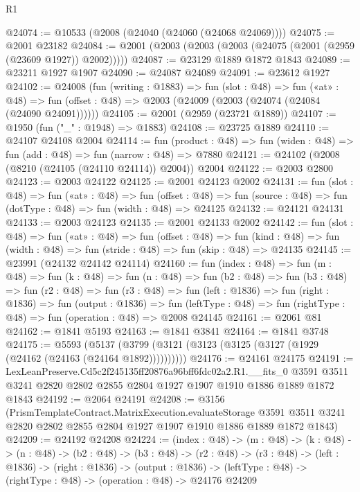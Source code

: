 \begin{lexlean}{R1}
\begin{coremodule}
@24074 := @10533 (@2008 (@24040 (@24060 (@24068 @24069))))
@24075 := @2001 @23182
@24084 := @2001 (@2003 (@2003 (@2003 (@24075 (@2001 (@2959 (@23609 @1927)) @2002)))))
@24087 := @23129 @1889 @1872 @1843
@24089 := @23211 @1927 @1907
@24090 := @24087 @24089
@24091 := @23612 @1927
@24102 := @24008
    (fun (writing : @1883) =>
    fun (slot : @48) =>
    fun («at» : @48) =>
    fun (offset : @48) => @2003 (@24009 (@2003 (@24074 (@24084 (@24090 @24091))))))
@24105 := @2001 (@2959 (@23721 @1889))
@24107 := @1950 (fun ("_" : @1948) => @1883)
@24108 := @23725 @1889
@24110 := @24107 @24108 @2004
@24114 := fun (product : @48) => fun (widen : @48) => fun (add : @48) => fun (narrow : @48) => @7880
@24121 := @24102 (@2008 (@8210 (@24105 (@24110 @24114)) @2004)) @2004
@24122 := @2003 @2800
@24123 := @2003 @24122
@24125 := @2001 @24123 @2002
@24131 := fun (slot : @48) =>
  fun («at» : @48) =>
  fun (offset : @48) => fun (source : @48) => fun (dotType : @48) => fun (width : @48) => @24125
@24132 := @24121 @24131
@24133 := @2003 @24123
@24135 := @2001 @24133 @2002
@24142 := fun (slot : @48) =>
  fun («at» : @48) =>
  fun (offset : @48) =>
  fun (kind : @48) => fun (width : @48) => fun (stride : @48) => fun (skip : @48) => @24135
@24145 := @23991 (@24132 @24142 @24114)
@24160 := fun (index : @48) =>
  fun (m : @48) =>
  fun (k : @48) =>
  fun (n : @48) =>
  fun (b2 : @48) =>
  fun (b3 : @48) =>
  fun (r2 : @48) =>
  fun (r3 : @48) =>
  fun (left : @1836) =>
  fun (right : @1836) =>
  fun (output : @1836) =>
  fun (leftType : @48) => fun (rightType : @48) => fun (operation : @48) => @2008 @24145
@24161 := @2061 @81
@24162 := @1841 @5193
@24163 := @1841 @3841
@24164 := @1841 @3748
@24175 := @5593
    (@5137 (@3799 (@3121 (@3123 (@3125 (@3127 (@1929 (@24162 (@24163 (@24164 @1892))))))))))
@24176 := @24161 @24175
@24191 := LexLeanPreserve.Cd5c2f245135ff20876a96bff6fdc02a2.R1.__fits_0
    @3591
    @3511
    @3241
    @2820
    @2802
    @2855
    @2804
    @1927
    @1907
    @1910
    @1886
    @1889
    @1872
    @1843
@24192 := @2064 @24191
@24208 := @3156
    (PrismTemplateContract.MatrixExecution.evaluateStorage
      @3591
      @3511
      @3241
      @2820
      @2802
      @2855
      @2804
      @1927
      @1907
      @1910
      @1886
      @1889
      @1872
      @1843)
@24209 := @24192 @24208
@24224 := (index : @48) ->
  (m : @48) ->
  (k : @48) ->
  (n : @48) ->
  (b2 : @48) ->
  (b3 : @48) ->
  (r2 : @48) ->
  (r3 : @48) ->
  (left : @1836) ->
  (right : @1836) ->
  (output : @1836) -> (leftType : @48) -> (rightType : @48) -> (operation : @48) -> @24176 @24209

\end{coremodule}
\end{lexlean}
